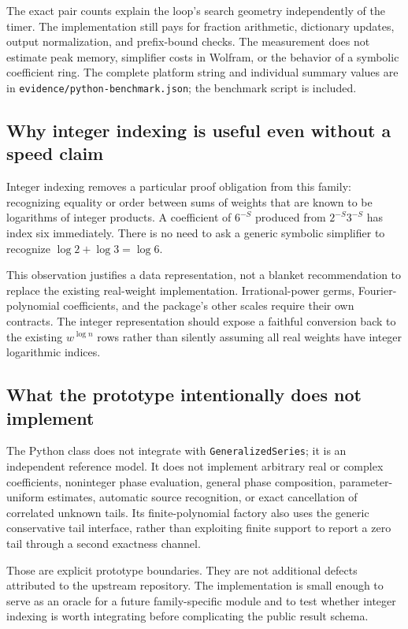 \documentclass[11pt,letterpaper]{article}
\newcommand{\code}[1]{\nolinkurl{#1}}
\begin{document}
The exact pair counts explain the loop's search geometry independently of the
timer. The implementation still pays for fraction arithmetic, dictionary
updates, output normalization, and prefix-bound checks. The measurement does
not estimate peak memory, simplifier costs in Wolfram, or the behavior of a
symbolic coefficient ring. The complete platform string and individual
summary values are in \code{evidence/python-benchmark.json}; the benchmark
script is included.

\subsection{Why integer indexing is useful even without a speed claim}
Integer indexing removes a particular proof obligation from this family:
recognizing equality or order between sums of weights that are known to be
logarithms of integer products. A coefficient of $6^{-S}$ produced from
$2^{-S}3^{-S}$ has index six immediately. There is no need to ask a generic
symbolic simplifier to recognize $\log2+\log3=\log6$.

This observation justifies a data representation, not a blanket recommendation
to replace the existing real-weight implementation. Irrational-power germs,
Fourier-polynomial coefficients, and the package's other scales require their
own contracts. The integer representation should expose a faithful conversion
back to the existing $w^{\log n}$ rows rather than silently assuming all real
weights have integer logarithmic indices.

\subsection{What the prototype intentionally does not implement}
The Python class does not integrate with \code{GeneralizedSeries}; it is an
independent reference model. It does not implement arbitrary real or complex
coefficients, noninteger phase evaluation, general phase composition,
parameter-uniform estimates, automatic source recognition, or exact
cancellation of correlated unknown tails. Its finite-polynomial factory also
uses the generic conservative tail interface, rather than exploiting finite
support to report a zero tail through a second exactness channel.

Those are explicit prototype boundaries. They are not additional defects
attributed to the upstream repository. The implementation is small enough to
serve as an oracle for a future family-specific module and to test whether
integer indexing is worth integrating before complicating the public result
schema.
\end{document}
